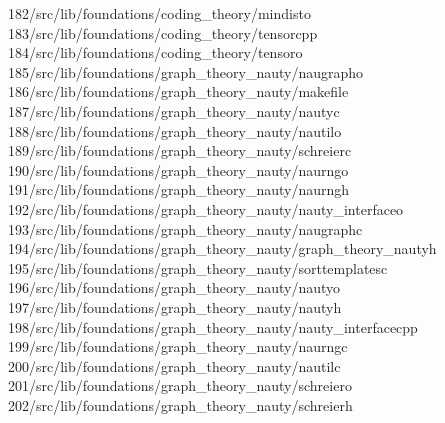 \begin{tabbing}
182\>/src/lib/foundations/coding\_theory/mindisto\\[0pt]
183\>/src/lib/foundations/coding\_theory/tensorcpp\\[0pt]
184\>/src/lib/foundations/coding\_theory/tensoro\\[0pt]
185\>/src/lib/foundations/graph\_theory\_nauty/naugrapho\\[0pt]
186\>/src/lib/foundations/graph\_theory\_nauty/makefile\\[0pt]
187\>/src/lib/foundations/graph\_theory\_nauty/nautyc\\[0pt]
188\>/src/lib/foundations/graph\_theory\_nauty/nautilo\\[0pt]
189\>/src/lib/foundations/graph\_theory\_nauty/schreierc\\[0pt]
190\>/src/lib/foundations/graph\_theory\_nauty/naurngo\\[0pt]
191\>/src/lib/foundations/graph\_theory\_nauty/naurngh\\[0pt]
192\>/src/lib/foundations/graph\_theory\_nauty/nauty\_interfaceo\\[0pt]
193\>/src/lib/foundations/graph\_theory\_nauty/naugraphc\\[0pt]
194\>/src/lib/foundations/graph\_theory\_nauty/graph\_theory\_nautyh\\[0pt]
195\>/src/lib/foundations/graph\_theory\_nauty/sorttemplatesc\\[0pt]
196\>/src/lib/foundations/graph\_theory\_nauty/nautyo\\[0pt]
197\>/src/lib/foundations/graph\_theory\_nauty/nautyh\\[0pt]
198\>/src/lib/foundations/graph\_theory\_nauty/nauty\_interfacecpp\\[0pt]
199\>/src/lib/foundations/graph\_theory\_nauty/naurngc\\[0pt]
200\>/src/lib/foundations/graph\_theory\_nauty/nautilc\\[0pt]
201\>/src/lib/foundations/graph\_theory\_nauty/schreiero\\[0pt]
202\>/src/lib/foundations/graph\_theory\_nauty/schreierh\\[0pt]

\end{tabbing}
